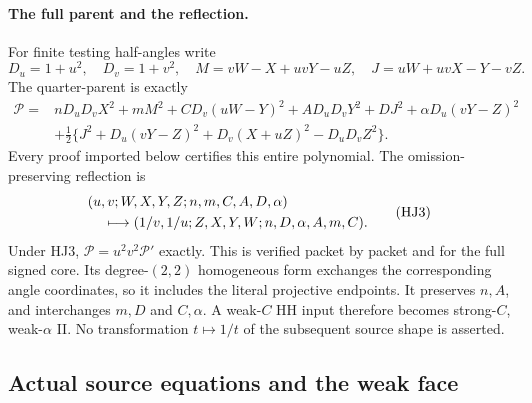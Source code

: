 \paragraph{The full parent and the reflection.}
For finite testing half-angles write
\[
 D_u=1+u^2,\quad D_v=1+v^2,\quad
 M=vW-X+uvY-uZ,\quad J=uW+uvX-Y-vZ .
\]
The quarter-parent is exactly
\[
\begin{split}
 \mathcal P={}&nD_uD_vX^2+mM^2+CD_v(uW-Y)^2
       +AD_uD_vY^2+DJ^2+\alpha D_u(vY-Z)^2\\
 &+\tfrac12\{J^2+D_u(vY-Z)^2+D_v(X+uZ)^2-D_uD_vZ^2\}.
\end{split}
\tag{HJ2}
\]
Every proof imported below certifies this entire polynomial.
The omission-preserving reflection is
\[
\begin{split}
 &(u,v;W,X,Y,Z;n,m,C,A,D,\alpha)\\
 &\hspace{4mm}\longmapsto
 (1/v,1/u;Z,X,Y,W;n,D,\alpha,A,m,C).
\end{split}
\tag{HJ3}
\]
Under HJ3, \(\mathcal P=u^2v^2\mathcal P'\) exactly.
This is verified packet by packet and for the full signed
core.  Its degree-\((2,2)\) homogeneous form exchanges
the corresponding angle coordinates, so it includes
the literal projective endpoints.
It preserves \(n,A\), and interchanges \(m,D\) and
\(C,\alpha\).  A weak-\(C\) HH input therefore becomes
strong-\(C\), weak-\(\alpha\) II.
No transformation \(t\mapsto1/t\) of the subsequent
source shape is asserted.

\subsection{Actual source equations and the weak face}

